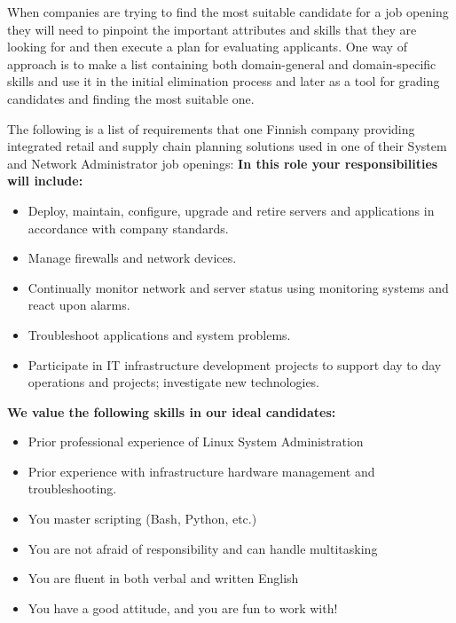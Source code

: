 \documentclass[11pt,a4paper,oneside,article]{memoir}
\begin{document}
When companies are trying to find the most suitable candidate for a job opening they will need to pinpoint the important attributes and skills that they are looking for and then execute a plan for evaluating applicants. One way of approach is to make a list containing both domain-general and domain-specific skills and use it in the initial elimination process and later as a tool for grading candidates and finding the most suitable one.

The following is a list of requirements that one Finnish company providing integrated retail and supply chain planning solutions used in one of their System and Network Administrator job openings: \cite{relex:apply}\newline
\textbf{In this role your responsibilities will include:}
\vspace{-17pt} 
\begin{itemize}
\item Deploy, maintain, configure, upgrade and retire servers and applications in accordance with company standards.
\item Manage firewalls and network devices.
\item Continually monitor network and server status using monitoring systems and react upon alarms.
\item Troubleshoot applications and system problems.
\item Participate in IT infrastructure development projects to support day to day operations and projects; investigate new technologies.
\end{itemize}
\vspace{-17pt}

\textbf{We value the following skills in our ideal candidates:}
\vspace{-17pt} 
\begin{itemize}
\item Prior professional experience of Linux System Administration
\item Prior experience with infrastructure hardware management and troubleshooting.
\item You master scripting (Bash, Python, etc.)
\item You are not afraid of responsibility and can handle multitasking
\item You are fluent in both verbal and written English
\item You have a good attitude, and you are fun to work with!
\end{itemize}
\vspace{-17pt}
\end{document}
